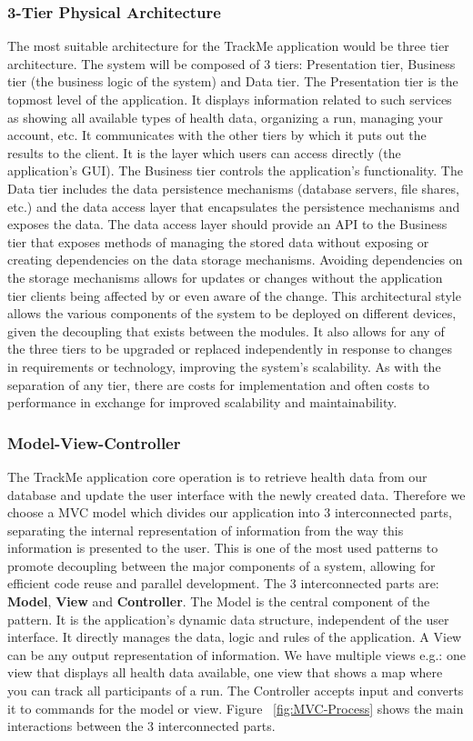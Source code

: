 \documentclass[12pt]{article}
\begin{document}
\subsubsection{3-Tier Physical Architecture}
The most suitable architecture for the TrackMe application would be three tier architecture. The system will be composed of 3 tiers: Presentation tier, Business tier (the business logic of the system) and Data tier. The Presentation tier is the topmost level of the application. It displays information related to such services as showing all available types of health data, organizing a run, managing your account, etc. It communicates with the other tiers by which it puts out the results to the client. It is the layer which users can access directly (the application's GUI). The Business tier controls the application’s functionality. The Data tier includes the data persistence mechanisms (database servers, file shares, etc.) and the data access layer that encapsulates the persistence mechanisms and exposes the data. The data access layer should provide an API to the Business tier that exposes methods of managing the stored data without exposing or creating dependencies on the data storage mechanisms. Avoiding dependencies on the storage mechanisms allows for updates or changes without the application tier clients being affected by or even aware of the change. This architectural style allows the various components of the system to be deployed on different devices, given the decoupling that exists between the modules. It also allows for any of the three tiers to be upgraded or replaced independently in response to changes in requirements or technology, improving the system’s scalability. As with the separation of any tier, there are costs for implementation and often costs to performance in exchange for improved scalability and maintainability.

\subsubsection{Model-View-Controller}
The TrackMe application core operation is to retrieve health data from our database and update the user 
interface with the newly created data. Therefore we choose a MVC model which divides our
application into 3 interconnected parts, separating the internal representation of information from the 
way this information is presented to the user. This is one of the most used patterns to promote 
decoupling between the major components of a system, allowing for efficient code reuse and parallel 
development. The 3 interconnected parts are: \textbf{Model}, \textbf{View} and \textbf{Controller}. The 
Model is the central component of the pattern. It is the application's dynamic data structure, 
independent of the user interface. It directly manages the data, logic and rules of the application. A 
View can be any output representation of information. We have multiple views e.g.: one view that 
displays all health data available, one view that shows a map where you can track all participants of a 
run. The Controller accepts input and converts it to commands for the model or view. Figure ~\ref{fig:MVC-Process} shows the main interactions between the 3 interconnected parts.
\vspace{10mm}
\end{document}
